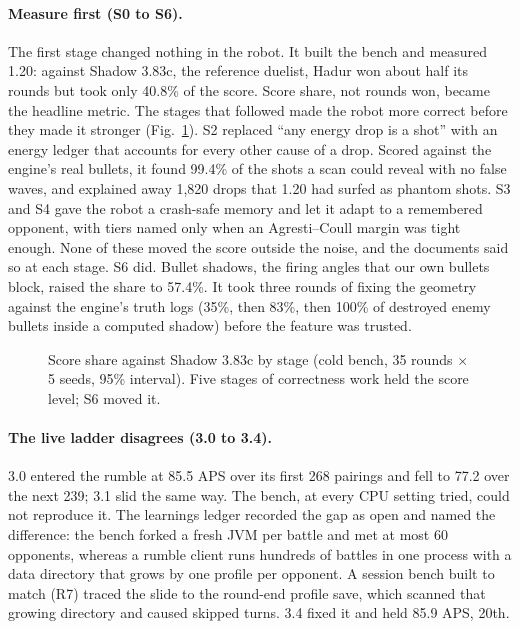 \documentclass[10pt,twocolumn]{article}
\begin{document}
\paragraph{Measure first (S0 to S6).} The first stage changed nothing in the robot. It built the
bench and measured 1.20: against Shadow 3.83c, the reference duelist, Hadur won about half its
rounds but took only 40.8\% of the score. Score share, not rounds won, became the headline metric.
The stages that followed made the robot more correct before they made it stronger
(Fig.~\ref{fig:shadow}). S2 replaced ``any energy drop is a shot'' with an energy ledger that
accounts for every other cause of a drop. Scored against the engine's real bullets, it found
99.4\% of the shots a scan could reveal with no false waves, and explained away 1,820 drops that
1.20 had surfed as phantom shots. S3 and S4 gave the robot a crash-safe memory and let it adapt
to a remembered opponent, with tiers named only when an Agresti--Coull margin \cite{agresti1998}
was tight enough. None of these moved the score outside the noise, and the documents said so at
each stage. S6 did. Bullet shadows, the firing angles that our own bullets block, raised the
share to 57.4\%. It took three rounds of fixing the geometry against the engine's truth logs
(35\%, then 83\%, then 100\% of destroyed enemy bullets inside a computed shadow) before the
feature was trusted.

\begin{figure}[t]
\centering

\caption{Score share against Shadow 3.83c by stage (cold bench, 35 rounds $\times$ 5 seeds, 95\%
interval). Five stages of correctness work held the score level; S6 moved it.}
\label{fig:shadow}
\end{figure}

\paragraph{The live ladder disagrees (3.0 to 3.4).} 3.0 entered the rumble at 85.5 APS over its first 268
pairings and fell to 77.2 over the next 239; 3.1 slid the same way. The bench, at every CPU setting tried, could
not reproduce it. The learnings ledger recorded the gap as open and named the difference: the bench
forked a fresh JVM per battle and met at most 60 opponents, whereas a rumble client runs hundreds of
battles in one process with a data directory that grows by one profile per opponent. A
session bench built to match (R7) traced the slide to the round-end profile save, which scanned that
growing directory and caused skipped turns. 3.4 fixed it and held 85.9 APS, 20th.
\end{document}

